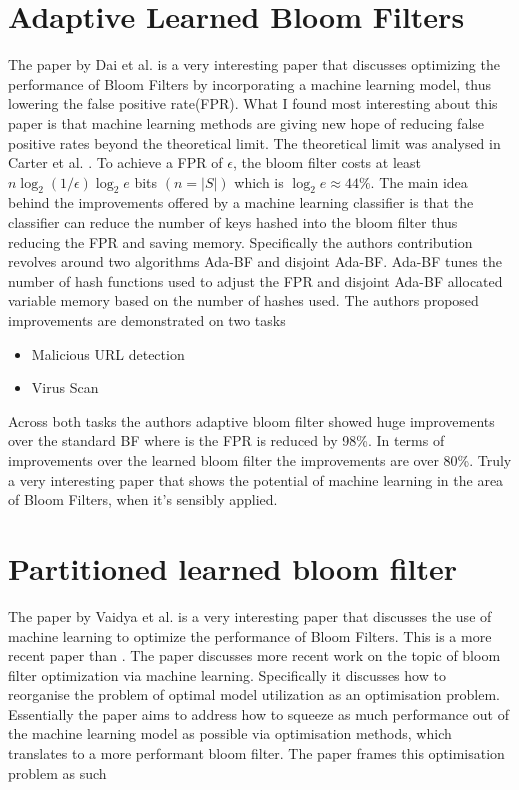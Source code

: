 \documentclass[MScCS]{uccthesis}
\begin{document}
\section{Adaptive Learned Bloom Filters}
The paper by Dai et al. \cite{dai2019adaptive} is a very interesting paper that discusses optimizing the performance of Bloom Filters by incorporating a machine learning model, thus lowering the false positive rate(FPR). What I found most interesting about this paper is that machine learning methods are giving new hope of reducing false positive rates beyond the theoretical limit. The theoretical limit was analysed in Carter et al. \cite{carter1978exact}. To achieve a FPR of $ \epsilon $, the bloom filter costs at least $ n \log_2 (1/\epsilon)\log_2 e$ bits $(n = |S|)$ which is $\log_2 e \approx 44\%$. The main idea behind the improvements offered by a machine learning classifier is that the classifier can reduce the number of keys hashed into the bloom filter thus reducing the FPR and saving memory. Specifically the authors contribution revolves around two algorithms Ada-BF and disjoint Ada-BF. Ada-BF tunes the number of hash functions used to adjust the FPR and disjoint Ada-BF allocated variable memory based on the number of hashes used. The authors proposed improvements are demonstrated on two tasks
\begin{itemize}
    \item Malicious URL detection
    \item Virus Scan
\end{itemize}

Across both tasks the authors adaptive bloom filter showed huge improvements over the standard BF where is the FPR is reduced by 98\%. In terms of improvements over the learned bloom filter the improvements are over 80\%. Truly a very interesting paper that shows the potential of machine learning in the area of Bloom Filters, when it's sensibly applied.

\section{Partitioned learned bloom filter}
The paper by Vaidya et al. \cite{vaidya2020partitioned} is a very interesting paper that discusses the use of machine learning to optimize the performance of Bloom Filters. This is a more recent paper than \cite{dai2019adaptive}. The paper discusses more recent work on the topic of bloom filter optimization via machine learning. Specifically it discusses how to reorganise the problem of optimal model utilization as an optimisation problem. Essentially the paper aims to address how to squeeze as much performance out of the machine learning model as possible via optimisation methods, which translates to a more performant bloom filter. The paper frames this optimisation problem as such
\end{document}
